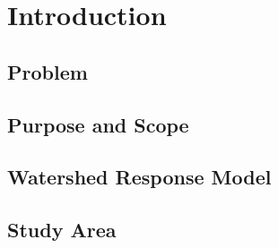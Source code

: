 \section{Introduction}
	\subsection{Problem}
	\subsection{Purpose and Scope}
	\subsection{Watershed Response Model}
	\subsection{Study Area}
\pagebreak